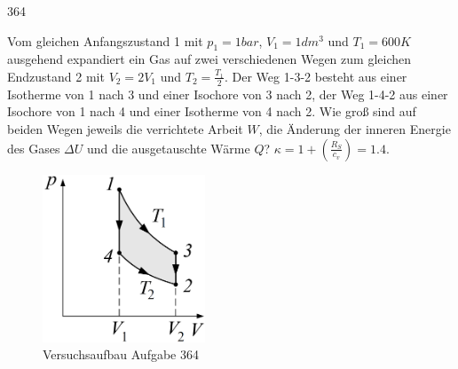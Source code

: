 \begin{auf}
    364
\end{auf}
Vom gleichen Anfangszustand 1 mit $p_1=1bar$, $V_1=1dm^3$ und $T_1=600K$ ausgehend expandiert ein Gas auf zwei verschiedenen Wegen zum gleichen	Endzustand 2 mit $V_2=2V_1$ und $T_2=\frac{T_1}{2}$. Der Weg 1-3-2 besteht aus einer Isotherme von 1 nach 3 und einer Isochore von 3 nach 2, der Weg 1-4-2 aus einer Isochore von 1 nach 4 und einer Isotherme von 4	nach 2. Wie groß sind auf beiden Wegen jeweils die verrichtete Arbeit $W$, die Änderung der inneren Energie des Gases $\Delta U$ und die ausgetauschte Wärme $Q$? $\kappa=1+\left(\frac{R_S}{c_v}\right)=1.4$.
\begin{figure}[h]
    \centering
    \includegraphics[height=5cm]{images/364_0.png}
    \caption{Versuchsaufbau Aufgabe 364}
\end{figure}